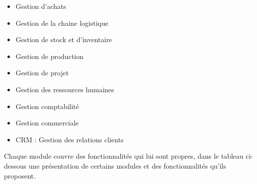         \begin{itemize}
            \item Gestion d’achats
            \item Gestion de la chaine logistique
            \item Gestion de stock et d’inventaire
            \item Gestion de production
            \item Gestion de projet
            \item Gestion des ressources humaines 
            \item Gestion comptabilité
            \item Gestion commerciale
            \item CRM : Gestion des relations clients\\
        \end{itemize}

        Chaque module couvre des fonctionnalités qui lui sont propres, dans le tableau ci-dessous une présentation de certains modules et des fonctionnalités qu’ils proposent.

